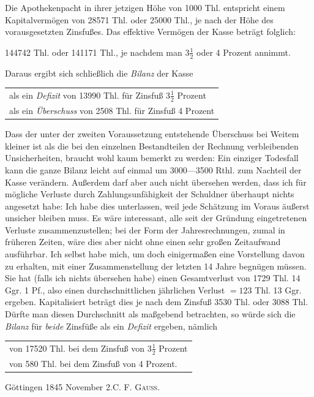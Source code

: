 Die Apothekenpacht in ihrer jetzigen Höhe von 1000 Thl. entspricht einem Kapitalvermögen von 28571 Thl. oder 25000 Thl., je nach der Höhe des vorausgesetzten Zinsfußes. Das effektive Vermögen der Kasse beträgt folglich:
\begin{center}
144742 Thl. oder 141171 Thl., je nachdem man \(3\tfrac{1}{2}\) oder 4 Prozent annimmt.
\end{center}
\noindent\hspace*{\parindent}Daraus ergibt sich schließlich die \textit{Bilanz} der Kasse
\begin{center}
\begin{tabular}{l}
als ein \textit{Defizit} von 13990 Thl. für Zinsfuß \(3\tfrac{1}{2}\) Prozent\\
als ein \textit{Überschuss} von 2508 Thl. für Zinsfuß 4 Prozent
\end{tabular}
\end{center}
\noindent\hspace*{\parindent}Dass der unter der zweiten Voraussetzung entstehende Überschuss bei Weitem kleiner ist als die bei den einzelnen Bestandteilen der Rechnung verbleibenden Unsicherheiten, braucht wohl kaum bemerkt zu werden: Ein einziger Todesfall kann die ganze Bilanz leicht auf einmal um 3000—3500 Rthl. zum Nachteil der Kasse verändern. Außerdem darf aber auch nicht übersehen werden, dass ich für mögliche Verluste durch Zahlungsunfähigkeit der Schuldner überhaupt nichts angesetzt habe: Ich habe dies unterlassen, weil jede Schätzung im Voraus äußerst unsicher bleiben muss. Es wäre interessant, alle seit der Gründung eingetretenen Verluste zusammenzustellen; bei der Form der Jahresrechnungen, zumal in früheren Zeiten, wäre dies aber nicht ohne einen sehr großen Zeitaufwand ausführbar. Ich selbst habe mich, um doch einigermaßen eine Vorstellung davon zu erhalten, mit einer Zusammenstellung der letzten 14 Jahre begnügen müssen. Sie hat (falls ich nichts übersehen habe) einen Gesamtverlust von 1729 Thl. 14 Ggr. 1 Pf., also einen durchschnittlichen jährlichen Verlust \(=123\) Thl. 13 Ggr. ergeben. Kapitalisiert beträgt dies je nach dem Zinsfuß 3530 Thl. oder 3088 Thl. Dürfte man diesen Durchschnitt als maßgebend betrachten, so würde sich die \textit{Bilanz} für \textit{beide} Zinsfüße als ein \textit{Defizit} ergeben, nämlich
\begin{center}
\begin{tabular}{l}
von 17520 Thl. bei dem Zinsfuß von \(3\tfrac{1}{2}\) Prozent\\
von\phantom{ 17} 580 Thl. bei dem Zinsfuß von 4 Prozent.
\end{tabular}
\end{center}
\noindent Göttingen 1845 November 2.\hfill C. F. \textsc{Gauss}.

